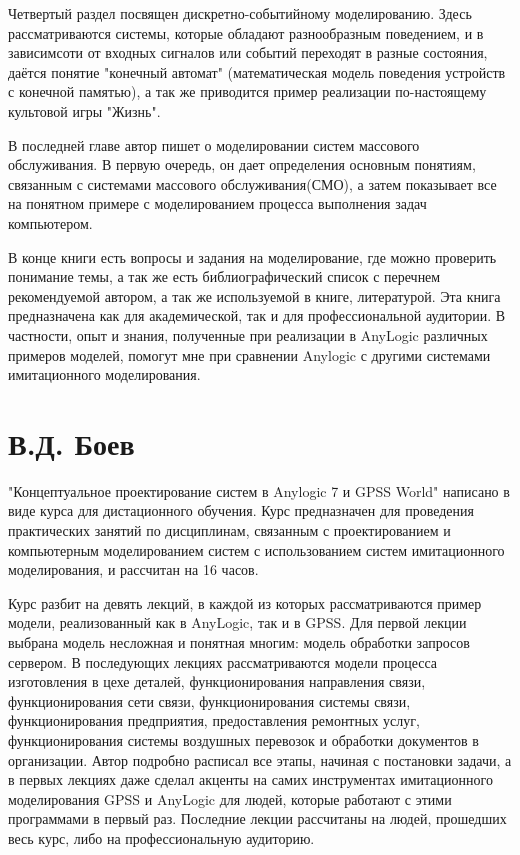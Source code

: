 \documentclass[a4paper,14pt]{report} %
\begin{document}
Четвертый раздел посвящен дискретно-событийному моделированию. Здесь рассматриваются системы, которые обладают разнообразным поведением, и в зависимсоти от входных сигналов или событий переходят в разные состояния, даётся понятие "конечный автомат" (математическая модель поведения устройств с конечной памятью), а так же приводится пример реализации по-настоящему культовой игры "Жизнь".

В последней главе автор пишет о моделировании систем массового обслуживания. В первую очередь, он дает определения основным понятиям, связанным с системами массового обслуживания(СМО), а затем показывает все на понятном примере с моделированием процесса выполнения задач компьютером. 

В конце книги есть вопросы и задания на моделирование, где можно проверить понимание темы, а так же есть библиографический список с перечнем рекомендуемой автором, а так же используемой в книге, литературой. Эта книга предназначена как для академической, так и для профессиональной аудитории. В частности, опыт и знания, полученные при реализации в AnyLogic различных примеров моделей, помогут мне при сравнении Anylogic с другими системами имитационного моделирования.

\section{В.Д. Боев}
"Концептуальное проектирование систем в Anylogic 7 и GPSS World" написано в виде курса для дистационного обучения. Курс предназначен для проведения практических занятий по дисциплинам, связанным с проектированием и компьютерным моделированием систем с использованием систем имитационного моделирования, и рассчитан на 16 часов. 

Курс разбит на девять лекций, в каждой из которых рассматриваются пример модели, реализованный как в AnyLogic, так и в GPSS. Для первой лекции выбрана модель несложная и понятная многим: модель обработки запросов сервером. В последующих лекциях рассматриваются модели процесса изготовления в цехе деталей, функционирования направления связи, функционирования сети связи, функционирования системы связи, функционирования предприятия, предоставления ремонтных услуг, функционирования системы воздушных перевозок и обработки документов в организации. Автор подробно расписал все этапы, начиная с постановки задачи, а в первых лекциях даже сделал акценты на самих инструментах имитационного моделирования GPSS и AnyLogic для людей, которые работают с этими программами в первый раз. Последние лекции рассчитаны на людей, прошедших весь курс, либо на профессиональную аудиторию. 
\end{document}
